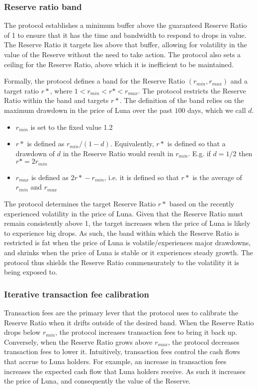 \documentclass{article}
\begin{document}
\subsubsection{Reserve ratio band}

The protocol establishes a minimum buffer above the guaranteed Reserve Ratio of 1 to ensure that it has the time and bandwidth to respond to drops in value. The Reserve Ratio it targets lies above that buffer, allowing for volatility in the value of the Reserve without the need to take action. The protocol also sets a ceiling for the Reserve Ratio, above which it is inefficient to be maintained.

Formally, the protocol defines a band for the Reserve Ratio $(r_{min}, r_{max})$ and a target ratio $r*$, where $1 < r_{min} < r* < r_{max}$. The protocol restricts the Reserve Ratio within the band and targets $r*$. The definition of the band relies on the maximum drawdown in the price of Luna over the past $100$ days, which we call $d$. 

\begin{itemize}
    \item $r_{min}$ is set to the fixed value 1.2
    \item $r*$ is defined as $r_{min}/(1-d)$. Equivalently, $r*$ is defined so that a drawdown of $d$ in the Reserve Ratio would result in $r_{min}$. E.g. if $d = 1/2$ then $r* = 2r_{min}$
    \item $r_{max}$ is defined as $2{r*} - r_{min}$, i.e. it is defined so that $r*$ is the average of $r_{min}$ and $r_{max}$
\end{itemize}


The protocol determines the target Reserve Ratio $r*$ based on the recently experienced volatility in the price of Luna. Given that the Reserve Ratio must remain consistently above 1, the target increases when the price of Luna is likely to experience big drops. As such, the band within which the Reserve Ratio is restricted is fat when the price of Luna is volatile/experiences major drawdowns, and shrinks when the price of Luna is stable or it experiences steady growth. The protocol thus shields the Reserve Ratio commensurately to the volatility it is being exposed to.

\subsubsection{Iterative transaction fee calibration}

Transaction fees are the primary lever that the protocol uses to calibrate the Reserve Ratio when it drifts outside of the desired band. When the Reserve Ratio drops below $r_{min}$, the protocol increases transaction fees to bring it back up. Conversely, when the Reserve Ratio grows above $r_{max}$, the protocol decreases transaction fees to lower it. Intuitively, transaction fees control the cash flows that accrue to Luna holders. For example, an increase in transaction fees increases the expected cash flow that Luna holders receive. As such it increases the price of Luna, and consequently the value of the Reserve.
\end{document}
